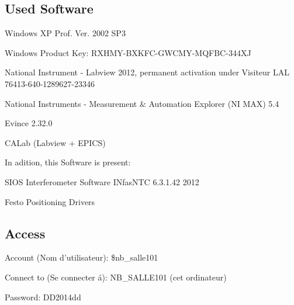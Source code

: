 \subsection{Used Software}
Windows XP Prof. Ver. 2002 SP3\par
Windows Product Key: RXHMY-BXKFC-GWCMY-MQFBC-344XJ\par
National Instrument - Labview 2012, permanent activation under Visiteur LAL 76413-640-1289627-23346\par
National Instruments - Measurement $\&$ Automation Explorer (NI MAX) 5.4\par
Evince 2.32.0\par
CALab (Labview + EPICS)\par
In adition, this Software is present:\par
SIOS Interferometer Software INfasNTC 6.3.1.42 2012\par
Festo Positioning Drivers\par

\subsection{Access}
Account (Nom d'utilisateur): \$nb\_salle101\par
Connect to (Se connecter \'a): NB\_SALLE101 (cet ordinateur)\par
Password: DD2014dd\par

